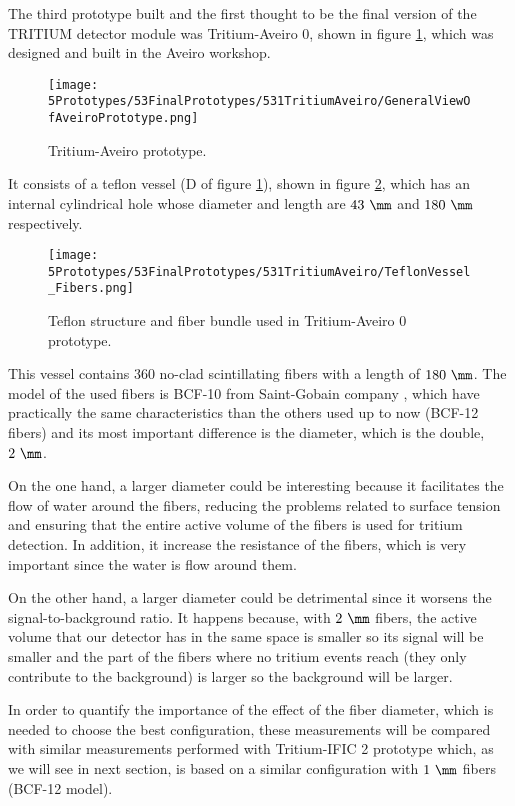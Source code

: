 The third prototype built and the first thought to be the final version of the TRITIUM detector module was Tritium-Aveiro 0, shown in figure \ref{fig:TritiumAveiro0}, which was designed and built in the Aveiro workshop. 

\begin{figure}[h]
\centering
\texttt{[image: 5Prototypes/53FinalPrototypes/531TritiumAveiro/GeneralViewOfAveiroPrototype.png]}
\caption{Tritium-Aveiro prototype.\label{fig:TritiumAveiro0}}
\end{figure}


It consists of a teflon vessel (D of figure \ref{fig:TritiumAveiro0}), shown in figure \ref{fig:TeflonStructureFibersTritiumAveiro0}, which has an internal cylindrical hole whose diameter and length are $43~\mm$ and $180~\mm$ respectively. 

\begin{figure}[h]
\centering
\texttt{[image: 5Prototypes/53FinalPrototypes/531TritiumAveiro/TeflonVessel\_Fibers.png]}
\caption{Teflon structure and fiber bundle used in Tritium-Aveiro 0 prototype.\label{fig:TeflonStructureFibersTritiumAveiro0}}
\end{figure}

This vessel contains $360$ no-clad scintillating fibers with a length of $180~\mm$. The model of the used fibers is BCF-10 from Saint-Gobain company \cite{DataSheetBCF10Fiber}, which have practically the same characteristics than the others used up to now (BCF-12 fibers) and its most important difference is the diameter, which is the double, $2~\mm$.

On the one hand, a larger diameter could be interesting because it facilitates the flow of water around the fibers, reducing the problems related to surface tension and ensuring that the entire active volume of the fibers is used for tritium detection. In addition, it increase the resistance of the fibers, which is very important since the water is flow around them.

On the other hand, a larger diameter could be detrimental since it worsens the signal-to-background ratio. It happens because, with $2~\mm$ fibers, the active volume that our detector has in the same space is smaller so its signal will be smaller and the part of the fibers where no tritium events reach (they only contribute to the background) is larger so the background will be larger.

In order to quantify the importance of the effect of the fiber diameter, which is needed to choose the best configuration, these measurements will be compared with similar measurements performed with Tritium-IFIC 2 prototype which, as we will see in next section, is based on a similar configuration with $1~\mm$ fibers (BCF-12 model).

